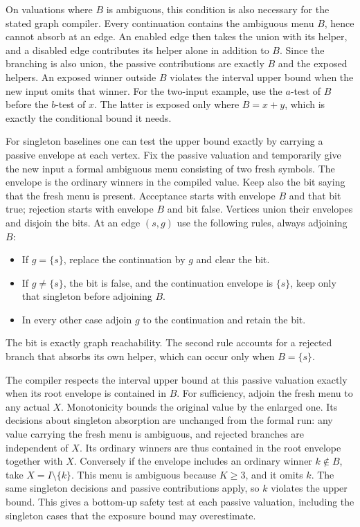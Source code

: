 On valuations where $B$ is ambiguous, this
condition is also necessary for the stated graph
compiler. Every continuation contains the ambiguous
menu $B$, hence cannot absorb at an edge. An enabled
edge then takes the union with its helper, and a
disabled edge contributes its helper alone in
addition to $B$. Since the branching is also union,
the passive contributions are exactly $B$ and
the exposed helpers. An exposed winner outside
$B$ violates the interval upper bound when the
new input omits that winner. For the two-input
example, use the $a$-test of $B$ before the $b$-test
of $x$. The latter is exposed only where $B=x+y$,
which is exactly the conditional bound it needs.

For singleton baselines one can test the upper
bound exactly by carrying a passive envelope at
each vertex. Fix the passive valuation and
temporarily give the new input a formal
ambiguous menu consisting of two fresh symbols.
The envelope is the ordinary winners in the
compiled value. Keep also the bit saying that
the fresh menu is present. Acceptance starts
with envelope $B$ and that bit true; rejection
starts with envelope $B$ and bit false.
Vertices union their envelopes and disjoin the
bits. At an edge $(s,g)$ use the following rules,
always adjoining $B$:
\begin{itemize}
\item If $g=\{s\}$, replace the continuation by
$g$ and clear the bit.
\item If $g\ne\{s\}$, the bit is false, and the
continuation envelope is $\{s\}$, keep only
that singleton before adjoining $B$.
\item In every other case adjoin $g$ to the
continuation and retain the bit.
\end{itemize}
The bit is exactly graph reachability. The
second rule accounts for a rejected branch
that absorbs its own helper, which can occur
only when $B=\{s\}$.

The compiler respects the interval upper bound
at this passive valuation exactly when its root
envelope is contained in $B$. For sufficiency,
adjoin the fresh menu to any actual $X$.
Monotonicity bounds the original value by the
enlarged one. Its decisions about singleton
absorption are unchanged from the formal run:
any value carrying the fresh menu is ambiguous,
and rejected branches are independent of $X$.
Its ordinary winners are thus contained in the
root envelope together with $X$. Conversely if
the envelope includes an ordinary winner
$k\notin B$, take $X=I\setminus\{k\}$. This menu
is ambiguous because $K\ge3$, and it omits $k$.
The same singleton decisions and passive
contributions apply, so $k$ violates the upper
bound. This gives a bottom-up safety test at
each passive valuation, including the
singleton cases that the exposure bound
may overestimate.

